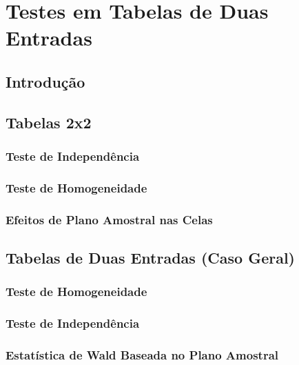 \documentclass[]{book}
\theoremstyle{definition}
\theoremstyle{definition}
\theoremstyle{definition}
\theoremstyle{remark}
\begin{document}
\chapter{Testes em Tabelas de Duas Entradas}\label{testetab2}

\section{Introdução}\label{introducao-2}

\section{Tabelas 2x2}\label{tabelas22}

\subsection{Teste de Independência}\label{teste-de-independencia}

\subsection{Teste de Homogeneidade}\label{teste-de-homogeneidade}

\subsection{Efeitos de Plano Amostral nas
Celas}\label{efeitos-de-plano-amostral-nas-celas}

\section{Tabelas de Duas Entradas (Caso
Geral)}\label{tabelas-de-duas-entradas-caso-geral}

\subsection{Teste de Homogeneidade}\label{teste-de-homogeneidade-1}

\subsection{Teste de Independência}\label{teste-de-independencia-1}

\subsection{Estatística de Wald Baseada no Plano
Amostral}\label{estatistica-de-wald-baseada-no-plano-amostral-1}
\end{document}

